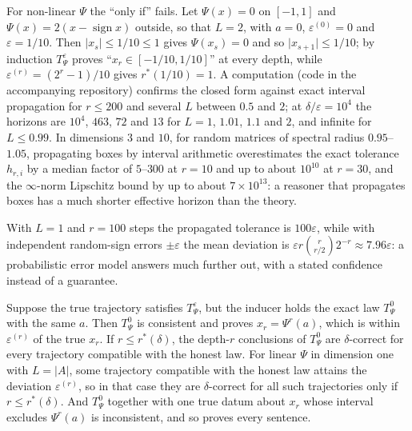 For non-linear $\Psi$ the ``only if'' fails. Let $\Psi(x)=0$ on $[-1,1]$ and $\Psi(x)=2(x-\operatorname{sign}x)$ outside, so that $L=2$, with $a=0$, $\varepsilon^{(0)}=0$ and $\varepsilon=1/10$. Then $\lvert x_s\rvert\le1/10\le1$ gives $\Psi(x_s)=0$ and so $\lvert x_{s+1}\rvert\le1/10$; by induction $T^\varepsilon_\Psi$ proves ``$x_r\in[-1/10,1/10]$'' at every depth, while $\varepsilon^{(r)}=(2^r-1)/10$ gives $r^*(1/10)=1$. A computation (code in the accompanying repository) confirms the closed form against exact interval propagation for $r\le200$ and several $L$ between $0.5$ and $2$; at $\delta/\varepsilon=10^4$ the horizons are $10^4$, $463$, $72$ and $13$ for $L=1$, $1.01$, $1.1$ and $2$, and infinite for $L\le0.99$. In dimensions $3$ and $10$, for random matrices of spectral radius $0.95$--$1.05$, propagating boxes by interval arithmetic overestimates the exact tolerance $h_{r,i}$ by a median factor of $5$--$300$ at $r=10$ and up to about $10^{10}$ at $r=30$, and the $\infty$-norm Lipschitz bound by up to about $7\times10^{13}$: a reasoner that propagates boxes has a much shorter effective horizon than the theory.

\begin{remark}\label{rem:laws:typical}
With $L=1$ and $r=100$ steps the propagated tolerance is $100\varepsilon$, while with independent random-sign errors $\pm\varepsilon$ the mean deviation is $\varepsilon r\binom{r}{r/2}2^{-r}\approx7.96\varepsilon$: a probabilistic error model answers much further out, with a stated confidence instead of a guarantee.
\end{remark}

\begin{proposition}\label{prop:laws:exacthorizon}
Suppose the true trajectory satisfies $T^\varepsilon_\Psi$, but the inducer holds the exact law $T^0_\Psi$ with the same $a$. Then $T^0_\Psi$ is consistent and proves $x_r=\Psi^r(a)$, which is within $\varepsilon^{(r)}$ of the true $x_r$. If $r\le r^*(\delta)$, the depth-$r$ conclusions of $T^0_\Psi$ are $\delta$-correct for every trajectory compatible with the honest law. For linear $\Psi$ in dimension one with $L=\lvert A\rvert$, some trajectory compatible with the honest law attains the deviation $\varepsilon^{(r)}$, so in that case they are $\delta$-correct for all such trajectories only if $r\le r^*(\delta)$. And $T^0_\Psi$ together with one true datum about $x_r$ whose interval excludes $\Psi^r(a)$ is inconsistent, and so proves every sentence.
\end{proposition}

